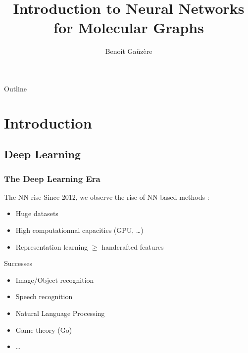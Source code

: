 \documentclass[11pt]{beamer}
\title{Introduction to Neural Networks for Molecular Graphs}
\author{Benoit Gaüzère}
\institute{INSA Rouen Normandie - Laboratoire LITIS}
\begin{document}
\maketitle


\begin{frame}{Outline}
  \tableofcontents
\end{frame}


\section{Introduction}
\subsection{Deep Learning}

\begin{frame}
  \frametitle{The Deep Learning Era}
  \begin{block}{The NN rise}
    Since 2012, we observe the rise of NN based methods :
    \begin{itemize}
    \item Huge datasets
    \item High computationnal capacities (GPU, \dots)
    \item Representation learning $\geq$ handcrafted features
    \end{itemize}
  \end{block}

  \begin{block}{Successes}
    \begin{itemize}
    \item Image/Object recognition
    \item Speech recognition
    \item Natural Language Processing
    \item Game theory (Go)
    \item \dots
    \end{itemize}
  \end{block}
\end{frame}
\end{document}
